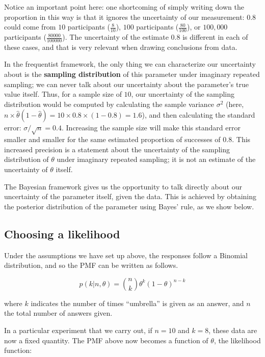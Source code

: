 \documentclass[12pt,]{krantz}
\theoremstyle{definition}
\theoremstyle{definition}
\theoremstyle{definition}
\theoremstyle{remark}
\begin{document}
Notice an important point here: one shortcoming of simply writing down
the proportion in this way is that it ignores the uncertainty of our
measurement: \(0.8\) could come from \(10\) participants
(\(\frac{8}{10}\)), \(100\) participants (\(\frac{80}{100}\)), or
\(100,000\) participants (\(\frac{80000}{100000}\)). The uncertainty of
the estimate \(0.8\) is different in each of these cases, and that is
very relevant when drawing conclusions from data.

In the frequentist framework, the only thing we can characterize our
uncertainty about is the \textbf{sampling distribution} of this
parameter under imaginary repeated sampling; we can never talk about our
uncertainty about the parameter's true value itself. Thus, for a sample
size of \(10\), our uncertainty of the sampling distribution would be
computed by calculating the sample variance \(\sigma^2\) (here,
\(n\times \hat\theta(1-\hat\theta)= 10\times 0.8 \times (1-0.8)=1.6\)),
and then calculating the standard error: \(\sigma/\sqrt{n}=0.4\).
Increasing the sample size will make this standard error smaller and
smaller for the same estimated proportion of successes of \(0.8\). This
increased precision is a statement about the uncertainty of the sampling
distribution of \(\theta\) under imaginary repeated sampling; it is not
an estimate of the uncertainty of \(\theta\) itself.

The Bayesian framework gives us the opportunity to talk directly about
our uncertainty of the parameter itself, given the data. This is
achieved by obtaining the posterior distribution of the parameter using
Bayes' rule, as we show below.

\subsection{Choosing a likelihood}\label{choosing-a-likelihood}

Under the assumptions we have set up above, the responses follow a
Binomial distribution, and so the PMF can be written as follows.

\begin{equation}
p(k|n,\theta) = \binom{n}
{k} \theta^k (1-\theta)^{n-k}
\label{eq:binom}
\end{equation}

where \(k\) indicates the number of times ``umbrella'' is given as an
answer, and \(n\) the total number of answers given.

In a particular experiment that we carry out, if \(n=10\) and \(k = 8\),
these data are now a fixed quantity. The PMF above now becomes a
function of \(\theta\), the likelihood function:
\end{document}
